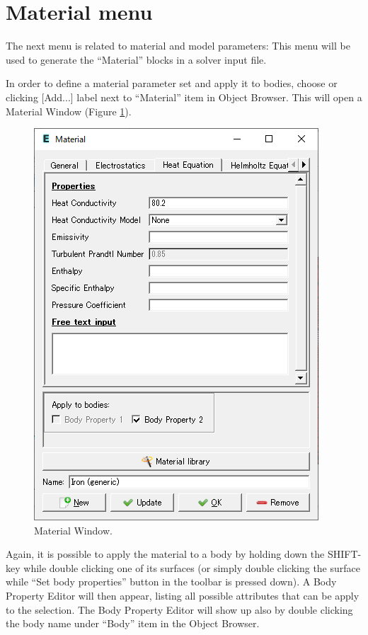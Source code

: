 \section{Material menu}

The next menu is related to material and model parameters:
This menu will be used to generate the ``Material'' blocks in a solver
input file.

\noindent In order to define a material parameter set and apply it to bodies, choose
\noindent or clicking [Add...] label next to ``Material'' item in Object Browser. This will open a Material Window (Figure \ref{fig:material}).

\begin{figure}[htb]
\begin{center}
 \includegraphics[scale=0.5]{images/material.png}
\caption{Material Window.}
\label{fig:material}
\end{center}
\end{figure}

Again, it is possible to apply the material to a body by holding down the
SHIFT-key while double clicking one of its surfaces (or simply double clicking the surface while ``Set body properties'' button in the toolbar is pressed down).
A Body Property Editor will then appear,
listing all possible attributes that can be apply to the selection. The Body Property Editor will show up also by double clicking the body name under ``Body'' item in the Object Browser. 

